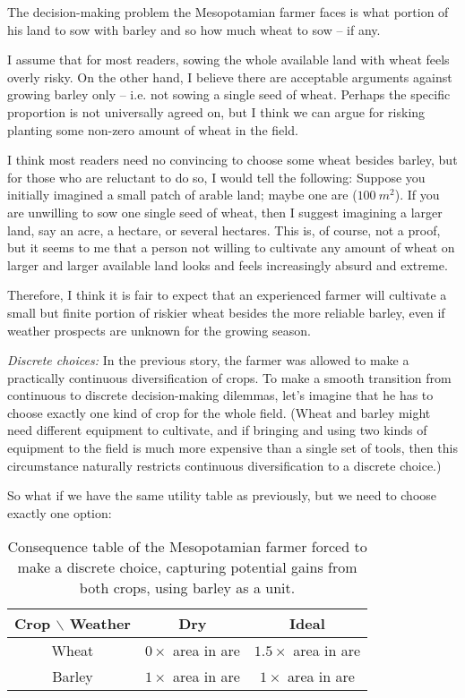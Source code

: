 \documentclass{article}
\begin{document}
The decision-making problem the Mesopotamian farmer faces is what portion of his land to sow with barley and so how much wheat to sow -- if any.

I assume that for most readers, sowing the whole available land with wheat feels overly risky.
On the other hand, I believe there are acceptable arguments against growing barley only -- i.e. not sowing a single seed of wheat.
Perhaps the specific proportion is not universally agreed on, but I think we can argue for risking planting some non-zero amount of wheat in the field.

I think most readers need no convincing to choose some wheat besides barley, but for those who are reluctant to do so, I would tell the following:
Suppose you initially imagined a small patch of arable land; maybe one are ($100\ m^2$). If you are unwilling to sow one single seed of wheat, then I suggest imagining a larger land, say an acre, a hectare, or several hectares.
This is, of course, not a proof, but it seems to me that a person not willing to cultivate any amount of wheat on larger and larger available land looks and feels increasingly absurd and extreme.

Therefore, I think it is fair to expect that an experienced farmer will cultivate a small but finite portion of riskier wheat besides the more reliable barley, even if weather prospects are unknown for the growing season.

{\it Discrete choices:}
In the previous story, the farmer was allowed to make a practically continuous diversification of crops. To make a smooth transition from continuous to discrete decision-making dilemmas, let's imagine that he has to choose exactly one kind of crop for the whole field. (Wheat and barley might need different equipment to cultivate, and if bringing and using two kinds of equipment to the field is much more expensive than a single set of tools, then this circumstance naturally restricts continuous diversification to a discrete choice.)

So what if we have the same utility table as previously, but we need to choose exactly one option:

\begin{table}[h!]
    \centering
    \begin{tabular}{c|cc}
        Crop $\backslash$ Weather & Dry & Ideal \\
        \hline
        Wheat & $0 \times$ area in are & $1.5 \times$ area in are \\
        Barley & $1 \times$ area in are & $1 \times$ area in are \\
    \end{tabular}
    \caption{Consequence table of the Mesopotamian farmer forced to make a discrete choice, capturing potential gains from both crops, using barley as a unit.}
    \label{tab:FarmersYields02}
\end{table}
\end{document}
